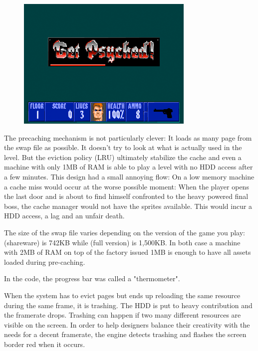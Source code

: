 \documentclass[book.tex]{subfiles}
\begin{document}
\begin{figure}[H]
\centering
 \includegraphics[width=\textwidth]{imgs/get_psyched.png}
 \end{figure}
 \par
The precaching mechanism is not particularly clever: It loads as many page from the swap file as possible. It doesn't try to look at what is actually used in the level. But the eviction policy (LRU) ultimately stabilize the cache and even a machine with only 1MB of RAM is able to play a level with no HDD access after a few minutes. This design had a small annoying flow: On a low memory machine a cache miss would occur at the worse possible moment: When the player opens the last door and is about to find himself confronted to the heavy powered final boss, the cache manager would not have the sprites available. This would incur a HDD access, a lag and an unfair death.\\
\par
The size of the swap file varies depending on the version of the game you play:  (shareware) is 742KB while  (full version) is 1,500KB. In both case a machine with 2MB of RAM on top of the factory issued 1MB is enough to have all assets loaded during pre-caching.\\
\par
{} In the code, the progress bar was called a "thermometer".\\
\par
{} When the system has to evict pages but ends up reloading the same resource during the same frame, it is trashing. The HDD is put to heavy contribution and the framerate drops. Trashing can happen if two many different resources are visible on the screen. In order to help designers balance their creativity with the needs for a decent framerate, the engine detects trashing and flashes the screen border red when it occurs.\\
\end{document}
